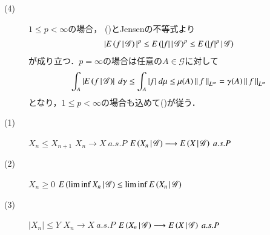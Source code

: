 \begin{prf}
\begin{description}
			\item[(4)] 
				$1 \leq p < \infty$の場合，
				()とJensenの不等式より
				\begin{align}
					|E\left( f \, \middle|\, \mathscr{G} \right)|^p \leq E\left( |f| \, \middle|\, \mathscr{G} \right)^p
					\leq E\left( |f|^p \, \middle|\, \mathscr{G} \right)
				\end{align}
				が成り立つ．$p = \infty$の場合は任意の$A \in \mathscr{G}$に対して
				\begin{align}
					\int_A \left| E\left( f \, \middle|\, \mathscr{G} \right) \right|\ d\gamma
					\leq \int_A |f|\ d\mu
					\leq \mu(A) \left\|\, f\, \right\|_{L^\infty}
					= \gamma(A) \left\|\, f\, \right\|_{L^\infty}
				\end{align}
				となり，$1 \leq p < \infty$の場合も込めて()が従う．
				\QED
		\end{description}
	\end{prf}
	
	\begin{screen}
		\begin{thm}
			\begin{description}
				\item[(1)]
					$X_n \leq X_{n+1}$
					$X_n \longrightarrow X\ a.s.P$
					$E\left( X_n \, \middle|\, \mathscr{G} \right) \longrightarrow E\left( X \, \middle|\, \mathscr{G} \right)\ a.s.P$
				\item[(2)]
					$X_n \geq 0$
					$E\left( \liminf X_n \, \middle|\, \mathscr{G} \right) \leq \liminf E\left( X_n \, \middle|\, \mathscr{G} \right)$
				\item[(3)]
					$|X_n| \leq Y$ $X_n \longrightarrow X\ a.s.P$
					$E\left( X_n \, \middle|\, \mathscr{G} \right) \longrightarrow E\left( X \, \middle|\, \mathscr{G} \right)\ a.s.P$
			\end{description}
		\end{thm}
	\end{screen}